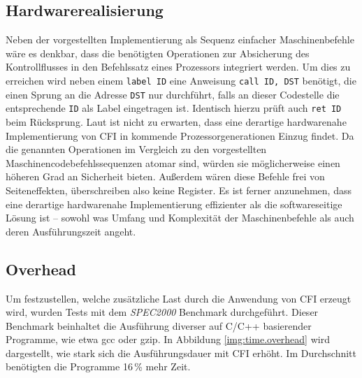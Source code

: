 \documentclass[12pt,%
               oneside,
               a4paper]{uiothesis}
\begin{document}
\subsection{Hardwarerealisierung}

Neben der vorgestellten Implementierung als Sequenz einfacher Maschinenbefehle wäre es denkbar, dass die benötigten Operationen zur Absicherung des Kontrollflusses in den Befehlssatz eines Prozessors integriert werden. Um dies zu erreichen wird neben einem \texttt{label ID} eine Anweisung \texttt{call ID, DST} benötigt, die einen Sprung an die Adresse \texttt{DST} nur durchführt, falls an dieser Codestelle die entsprechende \texttt{ID} als Label eingetragen ist. Identisch hierzu prüft auch \texttt{ret ID} beim Rücksprung. Laut \cite[S.9]{Abadi.2009} ist nicht zu erwarten, dass eine derartige hardwarenahe Implementierung von CFI in kommende Prozessorgenerationen Einzug findet. Da die genannten Operationen im Vergleich zu den vorgestellten Maschinencodebefehlssequenzen atomar sind, würden sie möglicherweise einen höheren Grad an Sicherheit bieten. Außerdem wären diese Befehle frei von Seiteneffekten, überschreiben also keine Register. Es ist ferner anzunehmen, dass eine derartige hardwarenahe Implementierung effizienter als die softwareseitige Lösung ist -- sowohl was Umfang und Komplexität der Maschinenbefehle als auch deren Ausführungszeit angeht.

\subsection{Overhead}
\label{sec:overhead}


Um festzustellen, welche zusätzliche Last durch die Anwendung von CFI erzeugt wird, wurden Tests mit dem \emph{SPEC2000} Benchmark durchgeführt. Dieser Benchmark beinhaltet die Ausführung diverser auf C/C++ basierender Programme, wie etwa gcc oder gzip. In Abbildung \ref{img:time.overhead} wird dargestellt, wie stark sich die Ausführungsdauer mit CFI erhöht. Im Durchschnitt benötigten die Programme 16\,\% mehr Zeit.
\end{document}
